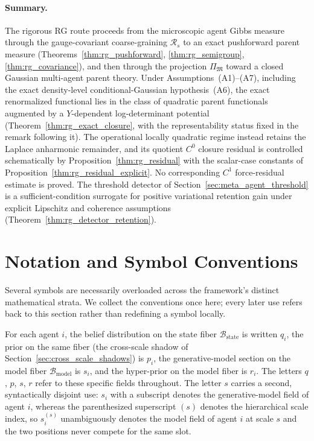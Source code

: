 \documentclass[11pt]{article}
\begin{document}
\paragraph{Summary.}
The rigorous RG route proceeds from the microscopic agent Gibbs measure through the gauge-covariant coarse-graining $\mathcal{R}_s$ to an exact pushforward parent measure (Theorems~\ref{thm:rg_pushforward}, \ref{thm:rg_semigroup}, \ref{thm:rg_covariance}), and then through the projection $\Pi_\mathfrak{M}$ toward a closed Gaussian multi-agent parent theory. Under Assumptions~(A1)--(A7), including the exact density-level conditional-Gaussian hypothesis~(A6), the exact renormalized functional lies in the class of quadratic parent functionals augmented by a $Y$-dependent log-determinant potential (Theorem~\ref{thm:rg_exact_closure}, with the representability status fixed in the remark following it). The operational locally quadratic regime instead retains the Laplace anharmonic remainder, and its quotient $C^0$ closure residual is controlled schematically by Proposition~\ref{thm:rg_residual} with the scalar-case constants of Proposition~\ref{thm:rg_residual_explicit}. No corresponding $C^1$ force-residual estimate is proved. The threshold detector of Section~\ref{sec:meta_agent_threshold} is a sufficient-condition surrogate for positive variational retention gain under explicit Lipschitz and coherence assumptions (Theorem~\ref{thm:rg_detector_retention}).

\section{Notation and Symbol Conventions}\label{sec:notation}

Several symbols are necessarily overloaded across the framework's distinct mathematical strata. We collect the conventions once here; every later use refers back to this section rather than redefining a symbol locally.

For each agent $i$, the belief distribution on the state fiber $\mathcal{B}_{\mathrm{state}}$ is written $q_i$, the prior on the same fiber (the cross-scale shadow of Section~\ref{sec:cross_scale_shadows}) is $p_i$, the generative-model section on the model fiber $\mathcal{B}_{\mathrm{model}}$ is $s_i$, and the hyper-prior on the model fiber is $r_i$. The letters $q$, $p$, $s$, $r$ refer to these specific fields throughout. The letter $s$ carries a second, syntactically disjoint use: $s_i$ with a subscript denotes the generative-model field of agent $i$, whereas the parenthesized superscript $(s)$ denotes the hierarchical scale index, so $s_i^{(s)}$ unambiguously denotes the model field of agent $i$ at scale $s$ and the two positions never compete for the same slot.
\end{document}

